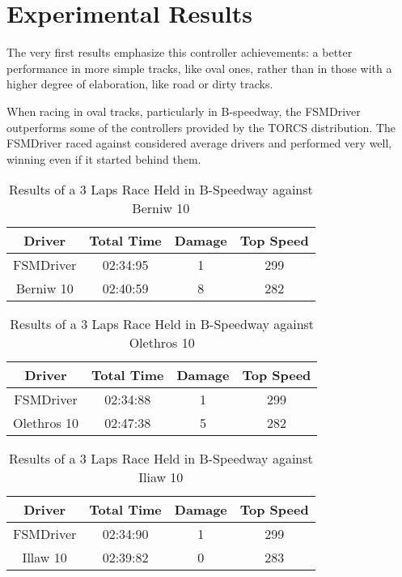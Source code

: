 \section{Experimental Results}

The very first results emphasize
this controller achievements: a better performance in more simple tracks, like oval ones, rather than in those with a higher degree of elaboration, like road or dirty tracks.

When racing in oval tracks, particularly in B-speedway, the FSMDriver outperforms some of the controllers provided by the TORCS distribution. The FSMDriver raced against considered average drivers and performed very well, winning even if it started behind them.

\begin{table}[h]
\renewcommand{\arraystretch}{1.3}
\caption{Results of a 3 Laps Race Held in B-Speedway against Berniw 10}
\label{table_1}
\centering
\begin{tabular}{c||c||c||c}
\hline
\bfseries Driver & \bfseries Total Time & \bfseries Damage & \bfseries Top Speed \\ 
\hline
\hline FSMDriver & 02:34:95 & 1 & 299 \\ 
\hline Berniw 10 & 02:40:59 & 8 & 282 \\ 
\hline 
\end{tabular}
\end{table}

\begin{table}[h]
\renewcommand{\arraystretch}{1.3}
\caption{Results of a 3 Laps Race Held in B-Speedway against Olethros 10}
\label{table_2}
\centering
\begin{tabular}{c||c||c||c}
\hline
\bfseries Driver & \bfseries Total Time & \bfseries Damage & \bfseries Top Speed \\ 
\hline
\hline FSMDriver & 02:34:88 & 1 & 299 \\ 
\hline Olethros 10 & 02:47:38 & 5 & 282 \\ 
\hline 
\end{tabular}
\end{table}

\begin{table}[h]
\renewcommand{\arraystretch}{1.3}
\caption{Results of a 3 Laps Race Held in B-Speedway against Iliaw 10}
\label{table_3}
\centering
\begin{tabular}{c||c||c||c}
\hline
\bfseries Driver & \bfseries Total Time & \bfseries Damage & \bfseries Top Speed \\ 
\hline
\hline FSMDriver & 02:34:90 & 1 & 299 \\ 
\hline Illaw 10 & 02:39:82 & 0 & 283 \\ 
\hline 
\end{tabular}
\end{table}



